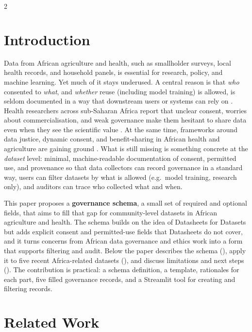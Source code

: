 \documentclass[11pt]{article}
\begin{document}
\sloppy
\begin{multicols}{2}

\section{Introduction}

Data from African agriculture and health, such as smallholder surveys, local health records, and household panels, is essential for research, policy, and machine learning. Yet much of it stays underused. A central reason is that \emph{who} consented to \emph{what}, and \emph{whether} reuse (including model training) is allowed, is seldom documented in a way that downstream users or systems can rely on \cite{brown2024,chabilall2024}. Health researchers across sub-Saharan Africa report that unclear consent, worries about commercialisation, and weak governance make them hesitant to share data even when they see the scientific value \cite{chabilall2024}. At the same time, frameworks around data justice, dynamic consent, and benefit-sharing in African health and agriculture are gaining ground \cite{munung2025,barrett2025}. What is still missing is something concrete at the \emph{dataset} level: minimal, machine-readable documentation of consent, permitted use, and provenance so that data collectors can record governance in a standard way, users can filter datasets by what is allowed (e.g.\ model training, research only), and auditors can trace who collected what and when.

This paper proposes a \textbf{governance schema}, a small set of required and optional fields, that aims to fill that gap for community-level datasets in African agriculture and health. The schema builds on the idea of Datasheets for Datasets \cite{gebru2021} but adds explicit consent and permitted-use fields that Datasheets do not cover, and it turns concerns from African data governance and ethics work \cite{munung2025,omutoko2024,brown2024} into a form that supports filtering and audit. Below the paper describes the schema (), apply it to five recent Africa-related datasets (), and discuss limitations and next steps (). The contribution is practical: a schema definition, a template, rationales for each part, five filled governance records, and a Streamlit tool for creating and filtering records.

\section{Related Work}


\end{multicols}
\end{document}
